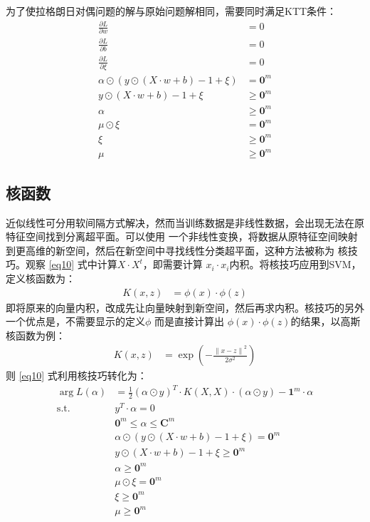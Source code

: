 \documentclass[12pt, a4paper, oneside]{ctexart}
\begin{document}
为了使拉格朗日对偶问题的解与原始问题解相同，需要同时满足KTT条件：
\begin{align}
    \frac{\partial L}{\partial w} &= 0 \nonumber \\
    \frac{\partial L}{\partial b} &= 0 \nonumber \\
    \frac{\partial L}{\partial \xi} &= 0 \nonumber \\
    {\alpha} \odot  (y \odot (X \cdot w + b) - 1 + \xi) &= \boldsymbol{0}^m \nonumber \\
    y \odot (X \cdot w + b) - 1  + \xi &\geq \boldsymbol{0}^m \nonumber \\
    {\alpha} &\geq \boldsymbol{0}^m  \nonumber \\
    \mu \odot \xi &=  \boldsymbol{0}^m \nonumber \\
    \xi &\geq \boldsymbol{0}^m  \nonumber \\
    \mu &\geq \boldsymbol{0}^m  \nonumber 
\end{align}



\subsection{核函数}
近似线性可分用软间隔方式解决，然而当训练数据是非线性数据，会出现无法在原特征空间找到分离超平面。可以使用
一个非线性变换，将数据从原特征空间映射到更高维的新空间，然后在新空间中寻找线性分类超平面，这种方法被称为
核技巧。观察 \eqref{eq10} 式中计算$X \cdot X^t $，即需要计算 $x_i \cdot x_i$内积。将核技巧应用到SVM，
定义核函数为：
\begin{align*}
K(x, z) &=  \phi(x) \cdot \phi(z)
\end{align*}
即将原来的向量内积，改成先让向量映射到新空间，然后再求内积。核技巧的另外一个优点是，不需要显示的定义$\phi$
而是直接计算出 $\phi(x) \cdot \phi(z)$的结果，以高斯核函数为例：
\begin{align*}
    K(x, z) &=  \exp ( -\frac{\left\|x-z\right\|^2}{2\sigma^2 }) 
\end{align*}
则 \eqref{eq10} 式利用核技巧转化为：
\begin{align}
    \mathop{\arg\min_{\alpha}}  L({\alpha}) &= \frac{1}{2}(\alpha \odot y)^T \cdot K(X, X) \cdot (\alpha \odot y) - \boldsymbol{1}^m \cdot \alpha \label{eq11}\\
    \mathrm{ s.t. }\ \   &y^T \cdot \alpha = 0 \nonumber \\
    & \boldsymbol{0}^m \leq \alpha \leq \boldsymbol{C}^m \nonumber \\
    &{\alpha} \odot  (y \odot (X \cdot w + b) - 1 + \xi) = \boldsymbol{0}^m \nonumber \\
    &y \odot (X \cdot w + b) - 1  + \xi \geq \boldsymbol{0}^m \nonumber \\
    &{\alpha} \geq \boldsymbol{0}^m  \nonumber \\
    &\mu \odot \xi =  \boldsymbol{0}^m \nonumber \\
    &\xi \geq \boldsymbol{0}^m  \nonumber \\
    &\mu \geq \boldsymbol{0}^m  \nonumber 
\end{align}
\end{document}
